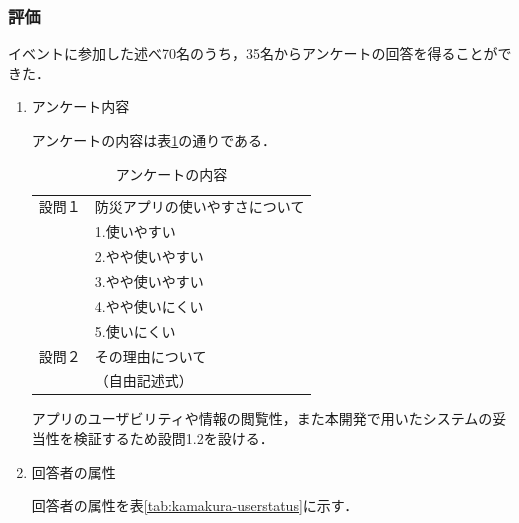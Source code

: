 \documentclass[a4paper]{jsarticle}
\begin{document}
\subsubsection{評価}
イベントに参加した述べ70名のうち，35名からアンケートの回答を得ることができた．

\begin{enumerate}
  \item アンケート内容

  アンケートの内容は表\ref{tab:kamakura-questionnaire-content}の通りである．

  \begin{table}[H]
    \begin{center}
      \caption{アンケートの内容}
      \renewcommand\arraystretch{1.2}
      \begin{tabular}{|c|l|}
        \hline
        設問１ & \multicolumn{1}{p{10cm}|}{防災アプリの使いやすさについて} \\
        & 1.使いやすい \\
        & 2.やや使いやすい \\
        & 3.やや使いやすい \\
        & 4.やや使いにくい \\
        & 5.使いにくい \\
        \hline
        設問２ & \multicolumn{1}{p{10cm}|}{その理由について} \\
        & （自由記述式） \\
        \hline
      \end{tabular}
      \label{tab:kamakura-questionnaire-content}
    \end{center}
  \end{table}

  アプリのユーザビリティや情報の閲覧性，また本開発で用いたシステムの妥当性を検証するため設問1.2を設ける．

  \item 回答者の属性

  回答者の属性を表\ref{tab:kamakura-userstatus}に示す．


\end{enumerate}
\end{document}

